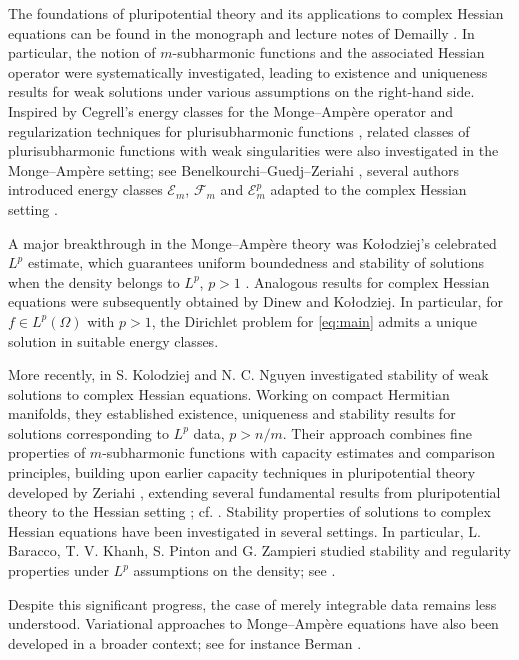 \documentclass[11pt,reqno]{amsart}
\theoremstyle{definition}
\theoremstyle{remark}
\begin{document}
	The foundations of pluripotential theory and its applications to complex Hessian equations
	can be found in the monograph and lecture notes of Demailly \cite{Demailly}.
	In particular, the notion of $m$-subharmonic functions and the associated Hessian operator were systematically investigated, leading to existence and uniqueness results for weak solutions under various assumptions on the right-hand side.
	Inspired by Cegrell's energy classes for the Monge--Amp\`ere operator \cite{Cegrell1998,Cegrell2004} and regularization techniques for plurisubharmonic functions \cite{BlockiKolodziej}, related classes of plurisubharmonic functions with weak singularities
	were also investigated in the Monge--Amp\`ere setting;
	see Benelkourchi--Guedj--Zeriahi \cite{Benelkourchi}, several authors introduced energy classes $\mathcal{E}_m$, $\mathcal{F}_m$ and $\mathcal{E}_m^p$ adapted to the complex Hessian setting \cite{Blocki2013,DinewKolodziej2014,Lu2013}.
	
	A major breakthrough in the Monge--Amp\`ere theory was Ko\l odziej's celebrated $L^p$ estimate\cite{Kolodziej1998,Kolodziej2005}, which guarantees uniform boundedness and stability of solutions when the density belongs to $L^p$, $p>1$ \cite{Kolodziej1998,Kolodziej2005}.
	Analogous results for complex Hessian equations were subsequently obtained by Dinew and Ko\l odziej\cite{DinewKolodziej2014}.
	In particular, for $f \in L^p(\Omega)$ with $p>1$, the Dirichlet problem for \eqref{eq:main} admits a unique solution in suitable energy classes.
	
	More recently, in \cite{Ko-Ng} S. Kolodziej and N. C. Nguyen investigated stability of weak solutions to complex Hessian equations.
	Working on compact Hermitian manifolds, they established existence, uniqueness and stability results for solutions corresponding to $L^p$ data, $p>n/m$.
	Their approach combines fine properties of $m$-subharmonic functions
	with capacity estimates and comparison principles,
	building upon earlier capacity techniques in pluripotential theory
	developed by Zeriahi \cite{Zeriahi2007}, extending several fundamental results from pluripotential theory to the Hessian setting ; cf. \cite{Kolodziej2005}.
	Stability properties of solutions to complex Hessian equations
	have been investigated in several settings.
	In particular, L. Baracco, T. V. Khanh, S. Pinton and G. Zampieri studied stability and regularity properties under $L^p$ assumptions
	on the density; see \cite{BKPG}.
	
	Despite this significant progress, the case of merely integrable data remains less understood. Variational approaches to Monge--Amp\`ere equations
	have also been developed in a broader context;
	see for instance Berman \cite{Berman}.
	
\end{document}
